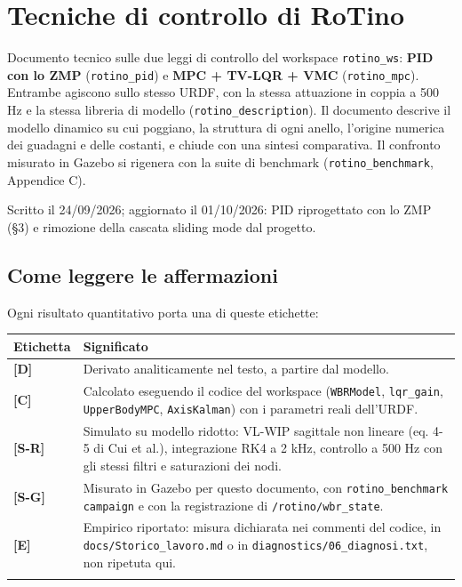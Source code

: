 \documentclass[
]{article}
\author{}
\date{}
\begin{document}
\section{Tecniche di controllo di RoTino}\label{tecniche-di-controllo-di-rotino}

Documento tecnico sulle due leggi di controllo del workspace \texttt{rotino\_ws}: \textbf{PID con lo ZMP} (\texttt{rotino\_pid}) e \textbf{MPC + TV-LQR + VMC} (\texttt{rotino\_mpc}). Entrambe agiscono sullo stesso URDF, con la stessa attuazione in coppia a 500 Hz e la stessa libreria di modello (\texttt{rotino\_description}). Il documento descrive il modello dinamico su cui poggiano, la struttura di ogni anello, l'origine numerica dei guadagni e delle costanti, e chiude con una sintesi comparativa. Il confronto misurato in Gazebo si rigenera con la suite di benchmark (\texttt{rotino\_benchmark}, Appendice C).

Scritto il 24/09/2026; aggiornato il 01/10/2026: PID riprogettato con lo ZMP (§3) e rimozione della cascata sliding mode dal progetto.

\subsection{Come leggere le affermazioni}\label{come-leggere-le-affermazioni}

Ogni risultato quantitativo porta una di queste etichette:

\begin{longtable}[]{@{}>{\raggedright\arraybackslash}p{}>{\raggedright\arraybackslash}p{}@{}}
\toprule\noalign{}
Etichetta & Significato \\
\midrule\noalign{}
\endhead
\textbf{[D]} & Derivato analiticamente nel testo, a partire dal modello. \\
\textbf{[C]} & Calcolato eseguendo il codice del workspace (\texttt{WBRModel}, \texttt{lqr\_gain}, \texttt{UpperBodyMPC}, \texttt{AxisKalman}) con i parametri reali dell'URDF. \\
\textbf{[S-R]} & Simulato su modello ridotto: VL-WIP sagittale non lineare (eq. 4-5 di Cui et al.), integrazione RK4 a 2 kHz, controllo a 500 Hz con gli stessi filtri e saturazioni dei nodi. \\
\textbf{[S-G]} & Misurato in Gazebo per questo documento, con \texttt{rotino\_benchmark campaign} e con la registrazione di \texttt{/rotino/wbr\_state}. \\
\textbf{[E]} & Empirico riportato: misura dichiarata nei commenti del codice, in \texttt{docs/Storico\_lavoro.md} o in \texttt{diagnostics/06\_diagnosi.txt}, non ripetuta qui. \\
\bottomrule\noalign{}
\end{longtable}
\end{document}
